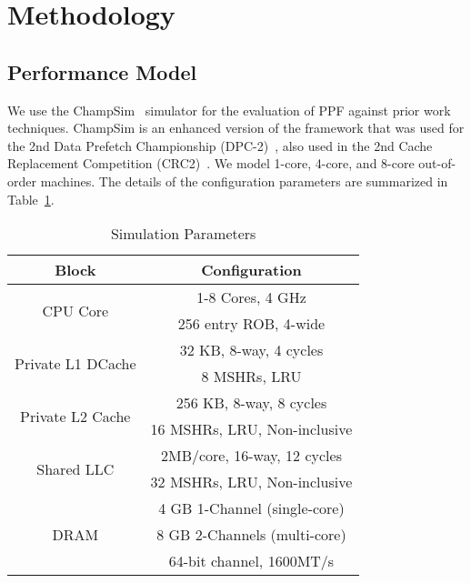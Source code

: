 \section{Methodology}
\label{Method}

\subsection{Performance Model}
\label{Method-Model}
We use the ChampSim~\cite{Champsim} simulator for the evaluation of
PPF against prior work techniques.  ChampSim is an enhanced version of
the framework that was used for the 2nd Data Prefetch Championship
(DPC-2)~\cite{DPC_2}, also used in the 2nd Cache Replacement
Competition (CRC2)~\cite{CRC_2}.  We model 1-core, 4-core, and 8-core
out-of-order machines.  The details of the configuration parameters
are summarized in Table~\ref{tab:Sim_params}.

\begin{table}[]
    \centering
    \begin{adjustbox}{width=0.9\columnwidth}
    \begin{tabular}{|c|c|}
    \hline
    	 Block & Configuration\\
    \hline
	 \multirow{2}{1.5cm}{CPU Core} 		& 1-8 Cores, 4 GHz\\
						& 256 entry ROB, 4-wide\\
    \hline
         \multirow{2}{2.7cm}{Private L1 DCache} & 32 KB, 8-way, 4 cycles\\
						& 8 MSHRs, LRU\\
    \hline
         \multirow{2}{2.4cm}{Private L2 Cache}  & 256 KB, 8-way, 8 cycles\\
						& 16 MSHRs, LRU, Non-inclusive\\		
    \hline
         \multirow{2}{1.7cm}{Shared LLC} 	& 2MB/core, 16-way, 12 cycles\\
						& 32 MSHRs, LRU, Non-inclusive\\
    \hline
         \multirow{3}{1.1cm}{DRAM} 		& 4 GB 1-Channel (single-core)\\ 
						& 8 GB 2-Channels (multi-core)\\ 
						& 64-bit channel, 1600MT/s\\
    \hline
    \end{tabular}
    \end{adjustbox}
    \caption{Simulation Parameters}
    \label{tab:Sim_params}
\end{table}


